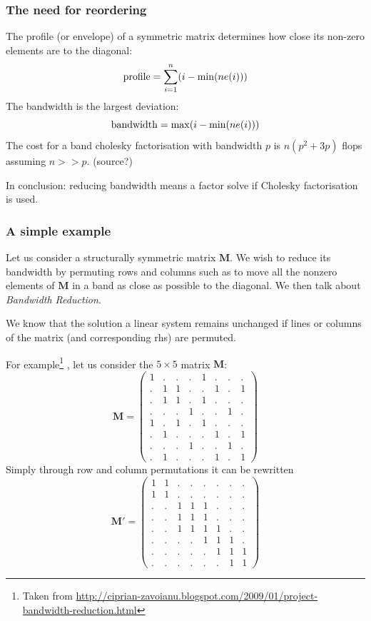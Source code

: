 

\subsubsection*{The need for reordering}


The profile (or envelope) of a symmetric matrix determines how
close its non-zero elements are to the diagonal:
\[
{\rm profile} = \sum_{i=1}^n (i-\min(ne(i)))
\]
The bandwidth is the largest deviation:
\[
{\rm bandwidth} = \max( i - \min (ne(i)))
\]
The cost for a band cholesky factorisation with
bandwidth $p$ is $n(p^2 + 3p)$ flops assuming $n>>p$.  (source?)

In conclusion: reducing bandwidth means a factor solve if Cholesky factorisation is used.


\subsubsection*{A simple example}


Let us consider a structurally symmetric matrix ${\bm M}$. 
We wish to reduce its bandwidth by permuting rows and columns 
such as to move all the nonzero elements of ${\bm M}$ 
in a band as close as possible to the diagonal.
We then talk about {\sl Bandwidth Reduction}. 

We know that the solution a linear system remains unchanged if lines or columns 
of the matrix (and corresponding rhs) are permuted.

For example\footnote{Taken from 
\url{http://ciprian-zavoianu.blogspot.com/2009/01/project-bandwidth-reduction.html}}
, let us consider the $5\times 5$ matrix ${\bm M}$:
\[
{\bm M}=
\left(
\begin{array}{cccccccc}
1 & . & . & . & 1 & . & . & . \\
. & 1 & 1 & . & . & 1 & . & 1 \\
. & 1 & 1 & . & 1 & . & . & . \\
. & . & . & 1 & . & . & 1 & . \\
1 & . & 1 & . & 1 & . & . & . \\
. & 1 & . & . & . & 1 & . & 1 \\
. & . & . & 1 & . & . & 1 & . \\
. & 1 & . & . & . & 1 & . & 1 
\end{array}
\right)
\]
Simply through row and column permutations it can be rewritten
\[
{\bm M}'=
\left(
\begin{array}{cccccccc}
1 & 1 & . & . & . & . & . & . \\
1 & 1 & . & . & . & . & . & . \\
. & . & 1 & 1 & 1 & . & . & . \\
. & . & 1 & 1 & 1 & . & . & . \\
. & . & 1 & 1 & 1 & 1 & . & . \\
. & . & . & . & 1 & 1 & 1 & . \\
. & . & . & . & . & 1 & 1 & 1 \\
. & . & . & . & . & . & 1 & 1 
\end{array}
\right)
\]



